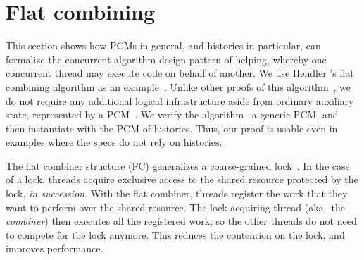 \section{Flat combining}
\label{sec:flatco}

This section shows how PCMs in general, and histories in particular,
can formalize the concurrent algorithm design pattern of helping,
whereby one concurrent thread may execute code on behalf of
another. We use Hendler \etal's flat combining algorithm as an
example~\cite{Hendler-al:SPAA10}.  Unlike other proofs of this
algorithm~\cite{Cerone-al:ICALP14,Turon-al:ICFP13}, we do not require
any additional logical infrastructure aside from ordinary auxiliary
state, represented by a
PCM~\cite{LeyWild-Nanevski:POPL13,Nanevski-al:ESOP14}.
%
%
We verify the algorithm \wrt~a generic PCM, and then instantiate with
the PCM of histories. Thus, our proof is usable even in examples where
the specs do not rely on histories. 

The flat combiner structure (FC) generalizes a coarse-grained
lock~\cite{Owicki-Gries:CACM76,Nanevski-al:ESOP14,OHearn:TCS07}. In
the case of a lock, threads acquire exclusive access to the shared
resource protected by the lock, \emph{in succession}. With the flat
combiner, threads register the work that they want to perform over the
shared resource. The lock-acquiring thread (aka.~the \emph{combiner})
then executes all the registered work, so the other threads do not need
to compete for the lock anymore. This reduces the contention on the
lock, and improves performance.


